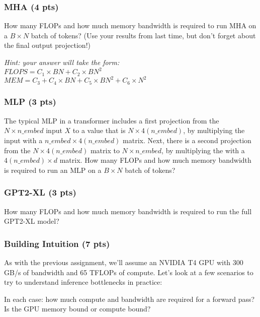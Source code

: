\subsubsection{MHA (4 pts)}

How many FLOPs and how much memory bandwidth is required to run MHA on a $B\times N$ batch of tokens? (Use your results from last time, but don't forget about the final output projection!)

\textit{Hint: your answer will take the form:\\ $FLOPS = C_1 \times BN + C_2 \times BN^2$ \\ $MEM = C_3 + C_4 \times BN + C_5 \times BN^2 + C_6 \times N^2$}

\begin{answer}

\end{answer}

\subsubsection{MLP (3 pts)}

The typical MLP in a transformer includes a first projection from the $N \times n\_embed$ input $X$ to a value that is $N \times 4(n\_embed)$, by multiplying the input with a $n\_embed \times 4(n\_embed)$ matrix. Next, there is a second projection from the $N \times 4(n\_embed)$ matrix to $N \times n\_embed$, by multiplying the with a $4(n\_embed) \times d$ matrix. How many FLOPs and how much memory bandwidth is required to run an MLP on a $B\times N$ batch of tokens? 

\begin{answer}

\end{answer}

\subsubsection{GPT2-XL (3 pts)}

How many FLOPs and how much memory bandwidth is required to run the full GPT2-XL model?

\begin{answer}

\end{answer}


\subsubsection{Building Intuition (7 pts)}

As with the previous assignment, we'll assume an NVIDIA T4 GPU with 300 GB/s of bandwidth and 65 TFLOPs of compute. Let's look at a few scenarios to try to understand inference bottlenecks in practice:
\begin{itemize}

\end{itemize}

In each case: how much compute and bandwidth are required for a forward pass? Is the GPU memory bound or compute bound?

\begin{answer}

\end{answer}